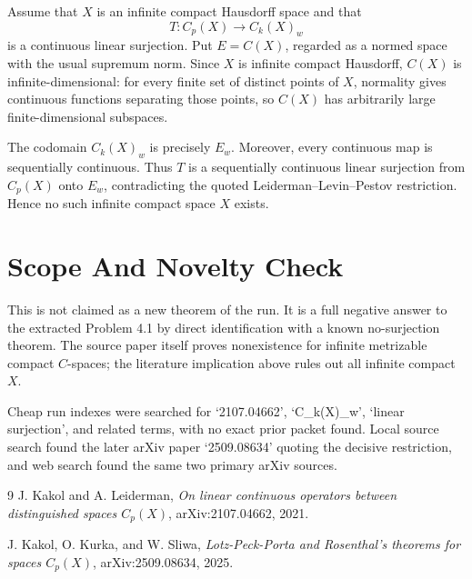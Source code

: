 \documentclass[11pt]{article}
\begin{document}
Assume that \(X\) is an infinite compact Hausdorff space and that
\[
T:C_p(X)\longrightarrow C_k(X)_w
\]
is a continuous linear surjection.  Put \(E=C(X)\), regarded as a normed
space with the usual supremum norm.  Since \(X\) is infinite compact
Hausdorff, \(C(X)\) is infinite-dimensional: for every finite set of
distinct points of \(X\), normality gives continuous functions separating
those points, so \(C(X)\) has arbitrarily large finite-dimensional
subspaces.

The codomain \(C_k(X)_w\) is precisely \(E_w\).  Moreover, every continuous
map is sequentially continuous.  Thus \(T\) is a sequentially continuous
linear surjection from \(C_p(X)\) onto \(E_w\), contradicting the quoted
Leiderman--Levin--Pestov restriction.  Hence no such infinite compact
space \(X\) exists.

\section*{Scope And Novelty Check}

This is not claimed as a new theorem of the run.  It is a full negative
answer to the extracted Problem 4.1 by direct identification with a known
no-surjection theorem.  The source paper itself proves nonexistence for
infinite metrizable compact \(C\)-spaces; the literature implication above
rules out all infinite compact \(X\).

Cheap run indexes were searched for `2107.04662', `C\_k(X)\_w',
`linear surjection', and related terms, with no exact prior packet found.
Local source search found the later arXiv paper `2509.08634' quoting the
decisive restriction, and web search found the same two primary arXiv
sources.

\begin{thebibliography}{9}
J. Kakol and A. Leiderman,
\emph{On linear continuous operators between distinguished spaces \(C_p(X)\)},
arXiv:2107.04662, 2021.

J. Kakol, O. Kurka, and W. Sliwa,
\emph{Lotz-Peck-Porta and Rosenthal's theorems for spaces \(C_p(X)\)},
arXiv:2509.08634, 2025.
\end{thebibliography}
\end{document}

